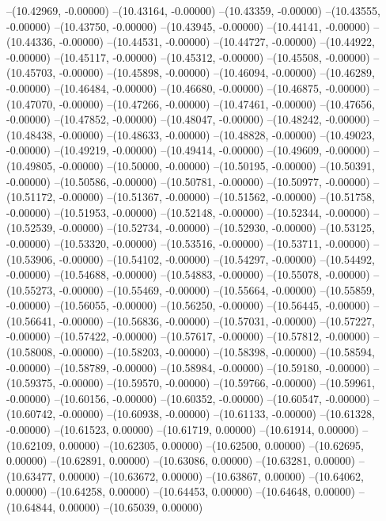 --(10.42969, -0.00000)
--(10.43164, -0.00000)
--(10.43359, -0.00000)
--(10.43555, -0.00000)
--(10.43750, -0.00000)
--(10.43945, -0.00000)
--(10.44141, -0.00000)
--(10.44336, -0.00000)
--(10.44531, -0.00000)
--(10.44727, -0.00000)
--(10.44922, -0.00000)
--(10.45117, -0.00000)
--(10.45312, -0.00000)
--(10.45508, -0.00000)
--(10.45703, -0.00000)
--(10.45898, -0.00000)
--(10.46094, -0.00000)
--(10.46289, -0.00000)
--(10.46484, -0.00000)
--(10.46680, -0.00000)
--(10.46875, -0.00000)
--(10.47070, -0.00000)
--(10.47266, -0.00000)
--(10.47461, -0.00000)
--(10.47656, -0.00000)
--(10.47852, -0.00000)
--(10.48047, -0.00000)
--(10.48242, -0.00000)
--(10.48438, -0.00000)
--(10.48633, -0.00000)
--(10.48828, -0.00000)
--(10.49023, -0.00000)
--(10.49219, -0.00000)
--(10.49414, -0.00000)
--(10.49609, -0.00000)
--(10.49805, -0.00000)
--(10.50000, -0.00000)
--(10.50195, -0.00000)
--(10.50391, -0.00000)
--(10.50586, -0.00000)
--(10.50781, -0.00000)
--(10.50977, -0.00000)
--(10.51172, -0.00000)
--(10.51367, -0.00000)
--(10.51562, -0.00000)
--(10.51758, -0.00000)
--(10.51953, -0.00000)
--(10.52148, -0.00000)
--(10.52344, -0.00000)
--(10.52539, -0.00000)
--(10.52734, -0.00000)
--(10.52930, -0.00000)
--(10.53125, -0.00000)
--(10.53320, -0.00000)
--(10.53516, -0.00000)
--(10.53711, -0.00000)
--(10.53906, -0.00000)
--(10.54102, -0.00000)
--(10.54297, -0.00000)
--(10.54492, -0.00000)
--(10.54688, -0.00000)
--(10.54883, -0.00000)
--(10.55078, -0.00000)
--(10.55273, -0.00000)
--(10.55469, -0.00000)
--(10.55664, -0.00000)
--(10.55859, -0.00000)
--(10.56055, -0.00000)
--(10.56250, -0.00000)
--(10.56445, -0.00000)
--(10.56641, -0.00000)
--(10.56836, -0.00000)
--(10.57031, -0.00000)
--(10.57227, -0.00000)
--(10.57422, -0.00000)
--(10.57617, -0.00000)
--(10.57812, -0.00000)
--(10.58008, -0.00000)
--(10.58203, -0.00000)
--(10.58398, -0.00000)
--(10.58594, -0.00000)
--(10.58789, -0.00000)
--(10.58984, -0.00000)
--(10.59180, -0.00000)
--(10.59375, -0.00000)
--(10.59570, -0.00000)
--(10.59766, -0.00000)
--(10.59961, -0.00000)
--(10.60156, -0.00000)
--(10.60352, -0.00000)
--(10.60547, -0.00000)
--(10.60742, -0.00000)
--(10.60938, -0.00000)
--(10.61133, -0.00000)
--(10.61328, -0.00000)
--(10.61523, 0.00000)
--(10.61719, 0.00000)
--(10.61914, 0.00000)
--(10.62109, 0.00000)
--(10.62305, 0.00000)
--(10.62500, 0.00000)
--(10.62695, 0.00000)
--(10.62891, 0.00000)
--(10.63086, 0.00000)
--(10.63281, 0.00000)
--(10.63477, 0.00000)
--(10.63672, 0.00000)
--(10.63867, 0.00000)
--(10.64062, 0.00000)
--(10.64258, 0.00000)
--(10.64453, 0.00000)
--(10.64648, 0.00000)
--(10.64844, 0.00000)
--(10.65039, 0.00000)
